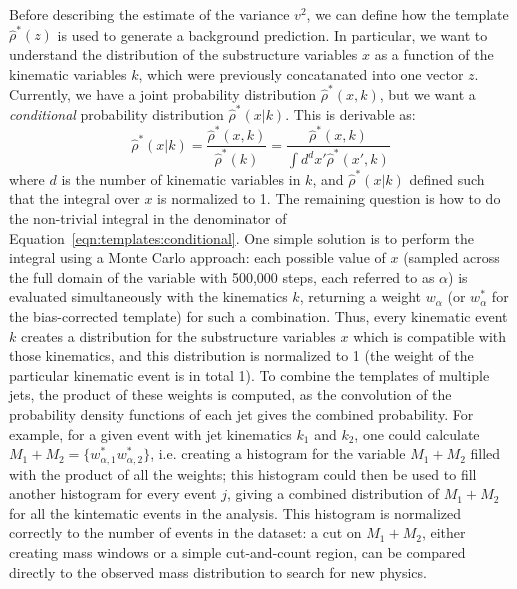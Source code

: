 Before describing the estimate of the variance $v^2$, we can define how the template $\hat{\rho}^*(z)$ is used to generate a background prediction. In particular, we want to understand the distribution of the substructure variables $x$ as a function of the kinematic variables $k$, which were previously concatanated into one vector $z$. Currently, we have a joint probability distribution $\hat{\rho}^*(x,k)$, but we want a \textit{conditional} probability distribution $\hat{\rho}^*(x|k)$. This is derivable as:
%
\begin{equation}
\label{eqn:templates:conditional}
\hat{\rho}^*(x|k) = \frac{\hat{\rho}^*(x,k)}{\hat{\rho}^*(k)} = \frac{\hat{\rho}^*(x,k)}{\int d^d x' \hat{\rho}^*(x',k)} 
\end{equation}
%
where $d$ is the number of kinematic variables in $k$, and $\hat{\rho}^*(x|k)$ defined such that the integral over $x$ is normalized to 1. The remaining question is how to do the non-trivial integral in the denominator of Equation~\ref{eqn:templates:conditional}. One simple solution is to perform the integral using a Monte Carlo approach: each possible value of $x$ (sampled across the full domain of the variable with 500,000 steps, each referred to as $\alpha$) is evaluated simultaneously with the kinematics $k$, returning a weight $w_\alpha$ (or $w^*_\alpha$ for the bias-corrected template) for such a combination. Thus, every kinematic event $k$ creates a distribution for the substructure variables $x$ which is compatible with those kinematics, and this distribution is normalized to 1 (the weight of the particular kinematic event is in total 1). To combine the templates of multiple jets, the product of these weights is computed, as the convolution of the probability density functions of each jet gives the combined probability. For example, for a given event with jet kinematics $k_1$ and $k_2$, one could calculate $M_1 + M_2 = \{w^*_{\alpha,1} w^*_{\alpha,2}\}$, i.e. creating a histogram for the variable $M_1 + M_2$ filled with the product of all the weights; this histogram could then be used to fill another histogram for every event $j$, giving a combined distribution of $M_1 + M_2$ for all the kintematic events in the analysis. This histogram is normalized correctly to the number of events in the dataset: a cut on $M_1 + M_2$, either creating mass windows or a simple cut-and-count region, can be compared directly to the observed mass distribution to search for new physics.

